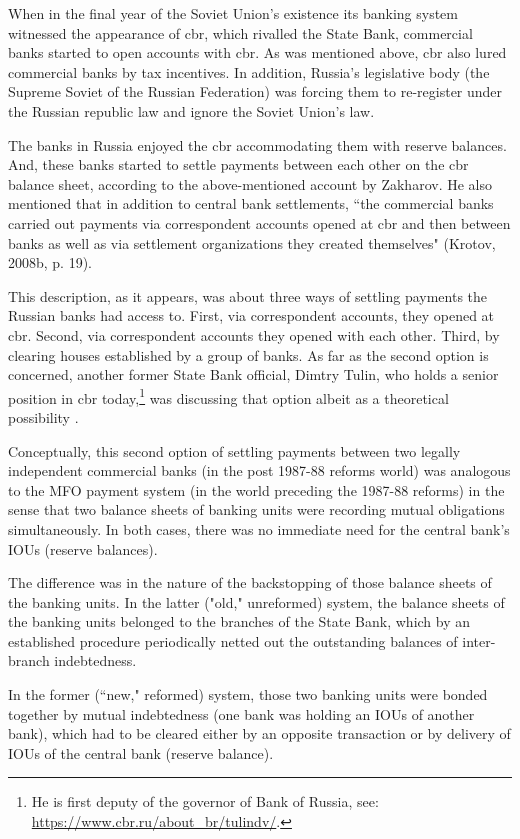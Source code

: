 When in the final year of the Soviet Union's existence its banking system witnessed the appearance of \ac{cbr}, which rivalled the State Bank, commercial banks started to open accounts with \ac{cbr}. As was mentioned above, \ac{cbr} also lured commercial banks by tax incentives. In addition, Russia's legislative body (the Supreme Soviet of the Russian Federation) was forcing them to re-register under the Russian republic law and ignore the Soviet Union's law. 

The banks in Russia enjoyed the \ac{cbr} accommodating them with reserve balances. And, these banks started to settle payments between each other on the \ac{cbr} balance sheet, according to the above-mentioned account by Zakharov. He also mentioned that in addition to central bank settlements, ``the commercial banks carried out payments via correspondent accounts opened at \ac{cbr} and then between banks as well as via settlement organizations they created themselves" (Krotov, 2008b, p. 19). 

This description, as it appears, was about three ways of settling payments the Russian banks had access to. First, via correspondent accounts, they opened at \ac{cbr}. Second, via correspondent accounts they opened with each other. Third, by clearing houses established by a group of banks. 
As far as the second option is concerned, another former State Bank official, Dimtry Tulin, who holds a senior position in \ac{cbr} today,\footnote{He is first deputy of the governor of Bank of Russia, see: \url{https://www.cbr.ru/about_br/tulindv/}.} was discussing that option albeit as a theoretical possibility \citep[pp.~42-43]{tulin2012}. 

Conceptually, this second option of settling payments between two legally independent commercial banks (in the post 1987-88 reforms world) was analogous to the MFO payment system (in the world preceding the 1987-88 reforms) in the sense that two balance sheets of banking units were recording mutual obligations simultaneously. In both cases, there was no immediate need for the central bank's IOUs (reserve balances). 

The difference was in the nature of the backstopping of those balance sheets of the banking units. In the latter ("old," unreformed) system, the balance sheets of the banking units belonged to the branches of the State Bank, which by an established procedure periodically netted out the outstanding balances of inter-branch indebtedness. 

In the former (``new," reformed) system, those two banking units were bonded together by mutual indebtedness (one bank was holding an IOUs of another bank), which had to be cleared either by an opposite transaction or by delivery of IOUs of the central bank (reserve balance).


